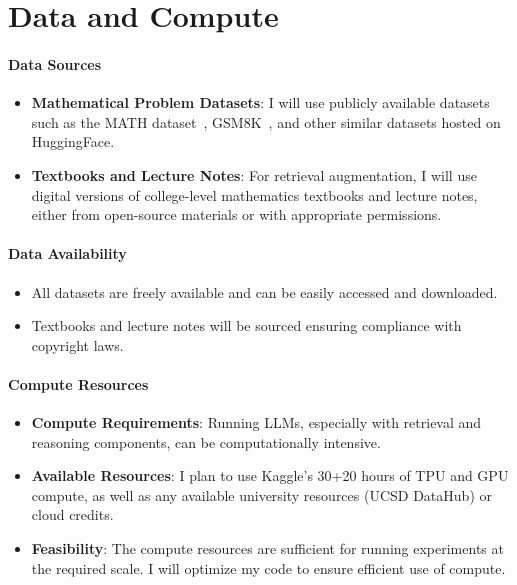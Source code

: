 \documentclass[11pt,a4paper]{article}
\begin{document}
\section{Data and Compute}

\paragraph{Data Sources}

\begin{itemize}
    \item \textbf{Mathematical Problem Datasets}: I will use publicly available datasets such as the MATH dataset~\cite{hendrycks2021measuring}, GSM8K~\cite{cobbe2021training}, and other similar datasets hosted on HuggingFace.

    \item \textbf{Textbooks and Lecture Notes}: For retrieval augmentation, I will use digital versions of college-level mathematics textbooks and lecture notes, either from open-source materials or with appropriate permissions.
\end{itemize}

\paragraph{Data Availability}

\begin{itemize}
    \item All datasets are freely available and can be easily accessed and downloaded.
    \item Textbooks and lecture notes will be sourced ensuring compliance with copyright laws.
\end{itemize}

\paragraph{Compute Resources}

\begin{itemize}
    \item \textbf{Compute Requirements}: Running LLMs, especially with retrieval and reasoning components, can be computationally intensive.
    \item \textbf{Available Resources}: I plan to use Kaggle's 30+20 hours of TPU and GPU compute, as well as any available university resources (UCSD DataHub) or cloud credits.
    \item \textbf{Feasibility}: The compute resources are sufficient for running experiments at the required scale. I will optimize my code to ensure efficient use of compute.
\end{itemize}


\footnotesize

\end{document}
